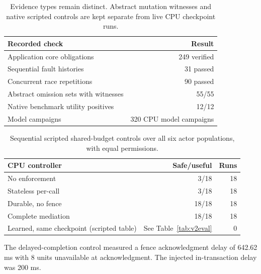 \begin{table}[t]\centering\small\begin{tabularx}{\columnwidth}{@{}Lr@{}}\toprule
Recorded check & Result\\\midrule
Application core obligations & 249 verified\\
Sequential fault histories & 31 passed\\
Concurrent race repetitions & 90 passed\\
Abstract omission sets with witnesses & 55/55\\
Native benchmark utility positives & 12/12\\
Model campaigns & 320 CPU model campaigns\\
\bottomrule\end{tabularx}\caption{Evidence types remain distinct. Abstract mutation witnesses and native scripted controls are kept separate from live CPU checkpoint runs.}\label{tab:v2summary}\end{table}
\begin{table}[t]\centering\small\begin{tabularx}{\columnwidth}{@{}Lrr@{}}\toprule
CPU controller & Safe/useful & Runs\\\midrule
No enforcement & 3/18 & 18\\
Stateless per-call & 3/18 & 18\\
Durable, no fence & 18/18 & 18\\
Complete mediation & 18/18 & 18\\
Learned, same checkpoint (scripted table) & See Table~\ref{tab:v2eval} & 0\\
\bottomrule\end{tabularx}\caption{Sequential scripted shared-budget controls over all six actor populations, with equal permissions.}\label{tab:v2controllers}\end{table}
The delayed-completion control measured a fence acknowledgment delay of 642.62 ms with 8 units unavailable at acknowledgment. The injected in-transaction delay was 200 ms.

